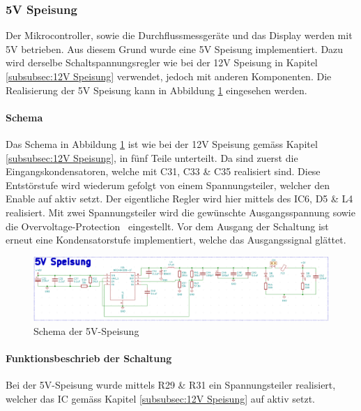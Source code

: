 \subsubsection{5V Speisung}
\label{subsubsec:5V Speisung}

Der Mikrocontroller, sowie die Durchflussmessgeräte und das Display  werden mit 5V betrieben. Aus diesem Grund wurde eine 5V Speisung implementiert. Dazu wird derselbe Schaltspannungsregler wie bei der 12V Speisung in Kapitel \ref{subsubsec:12V Speisung} verwendet, jedoch mit anderen Komponenten. Die Realisierung der 5V Speisung kann in Abbildung \ref{fig:Schema_Speisung_5V} eingesehen werden.\\

\paragraph{Schema}\mbox{}

Das Schema in Abbildung \ref{fig:Schema_Speisung_5V} ist wie bei der 12V Speisung gemäss Kapitel \ref{subsubsec:12V Speisung}, in fünf Teile unterteilt. Da sind zuerst die Eingangskondensatoren, welche mit C31, C33 \& C35 realisiert sind. Diese Entstörstufe wird wiederum gefolgt von einem Spannungsteiler, welcher den Enable auf aktiv setzt. Der eigentliche Regler wird hier mittels des IC6, D5 \& L4 realisiert. Mit zwei Spannungsteiler wird die gewünschte Ausgangsspannung sowie die \flqq Overvoltage-Protection\frqq~ eingestellt. Vor dem Ausgang der Schaltung ist erneut eine Kondensatorstufe implementiert, welche das Ausgangssignal glättet.

\begin{figure}[h!]
	\centering
	\includegraphics[width=\textwidth]{graphics/Schema_Speisung_5V.png}
	\caption{Schema der 5V-Speisung}
	\label{fig:Schema_Speisung_5V}
\end{figure} 

\paragraph{Funktionsbeschrieb der Schaltung}\mbox{}

Bei der 5V-Speisung wurde mittels R29 \& R31 ein Spannungsteiler realisiert, welcher das IC gemäss Kapitel \ref{subsubsec:12V Speisung} auf aktiv setzt.

